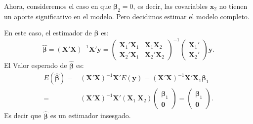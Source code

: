 \documentclass[
]{article}
\begin{document}
Ahora, consideremos el caso en que \(\boldsymbol \beta_2=0\), es decir, las covariables \(\boldsymbol x_{2}\) no tienen un aporte significativo en el modelo. Pero decidimos estimar el modelo completo.

En este caso, el estimador de \(\boldsymbol \beta\) es:
\[
\widehat{\boldsymbol \beta}= (\boldsymbol X'\boldsymbol X)^{-1}\boldsymbol X'\boldsymbol y= \begin{pmatrix}
\boldsymbol X_{1}'\boldsymbol X_{1} & \boldsymbol X_{1}\boldsymbol X_{2} \\ \boldsymbol X_{2}'\boldsymbol X_{1} & \boldsymbol X_{2}'\boldsymbol X_{2}
\end{pmatrix}^{-1} \begin{pmatrix}
\boldsymbol X_{1}' \\ \boldsymbol X_{2}'
\end{pmatrix}\boldsymbol y.
\]
El Valor esperado de \(\widehat{\boldsymbol \beta}\) es:
\begin{equation}
\begin{split}
E(\widehat{\boldsymbol \beta}) =& (\boldsymbol X'\boldsymbol X)^{-1}\boldsymbol X'E(\boldsymbol y) = (\boldsymbol X'\boldsymbol X)^{-1}\boldsymbol X'\boldsymbol X_{1}\boldsymbol \beta_1 \\
 = & (\boldsymbol X'\boldsymbol X)^{-1}\boldsymbol X'(\boldsymbol X_{1} \ \boldsymbol X_{2}) \begin{pmatrix}
 \boldsymbol \beta_1 \\ \boldsymbol 0
 \end{pmatrix} = \begin{pmatrix}
 \boldsymbol \beta_1 \\ \boldsymbol 0
 \end{pmatrix}.
\end{split}
\nonumber
\end{equation}
Es decir que \(\widehat{\boldsymbol \beta}\) es un estimador insesgado.
\end{document}
